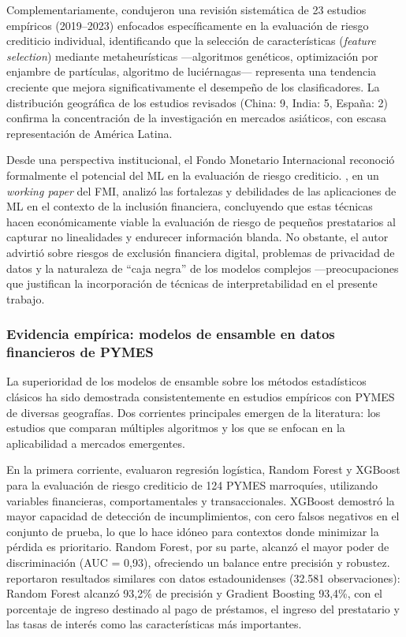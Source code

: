 \documentclass[12pt, letterpaper]{article}
\begin{document}
Complementariamente, \citet{Paz2025} condujeron una revisi\'on sistem\'atica de 23 estudios emp\'iricos (2019--2023) enfocados espec\'ificamente en la evaluaci\'on de riesgo crediticio individual, identificando que la selecci\'on de caracter\'isticas (\textit{feature selection}) mediante metaheur\'isticas ---algoritmos gen\'eticos, optimizaci\'on por enjambre de part\'iculas, algoritmo de luci\'ernagas--- representa una tendencia creciente que mejora significativamente el desempe\~no de los clasificadores. La distribuci\'on geogr\'afica de los estudios revisados (China: 9, India: 5, Espa\~na: 2) confirma la concentraci\'on de la investigaci\'on en mercados asi\'aticos, con escasa representaci\'on de Am\'erica Latina.

Desde una perspectiva institucional, el Fondo Monetario Internacional reconoci\'o formalmente el potencial del ML en la evaluaci\'on de riesgo crediticio. \citet{Bazarbash2019}, en un \textit{working paper} del FMI, analiz\'o las fortalezas y debilidades de las aplicaciones de ML en el contexto de la inclusi\'on financiera, concluyendo que estas t\'ecnicas hacen econ\'omicamente viable la evaluaci\'on de riesgo de peque\~nos prestatarios al capturar no linealidades y endurecer informaci\'on blanda. No obstante, el autor advirti\'o sobre riesgos de exclusi\'on financiera digital, problemas de privacidad de datos y la naturaleza de ``caja negra'' de los modelos complejos ---preocupaciones que justifican la incorporaci\'on de t\'ecnicas de interpretabilidad en el presente trabajo.

\subsubsection{Evidencia emp\'irica: modelos de ensamble en datos financieros de PYMES}

La superioridad de los modelos de ensamble sobre los m\'etodos estad\'isticos cl\'asicos ha sido demostrada consistentemente en estudios emp\'iricos con PYMES de diversas geograf\'ias. Dos corrientes principales emergen de la literatura: los estudios que comparan m\'ultiples algoritmos y los que se enfocan en la aplicabilidad a mercados emergentes.

En la primera corriente, \citet{Boumhidi2025} evaluaron regresi\'on log\'istica, Random Forest y XGBoost para la evaluaci\'on de riesgo crediticio de 124 PYMES marroqu\'ies, utilizando variables financieras, comportamentales y transaccionales. XGBoost demostr\'o la mayor capacidad de detecci\'on de incumplimientos, con cero falsos negativos en el conjunto de prueba, lo que lo hace id\'oneo para contextos donde minimizar la p\'erdida es prioritario. Random Forest, por su parte, alcanz\'o el mayor poder de discriminaci\'on (AUC = 0,93), ofreciendo un balance entre precisi\'on y robustez. \citet{Yufenyuy2024} reportaron resultados similares con datos estadounidenses (32.581 observaciones): Random Forest alcanz\'o 93,2\% de precisi\'on y Gradient Boosting 93,4\%, con el porcentaje de ingreso destinado al pago de pr\'estamos, el ingreso del prestatario y las tasas de inter\'es como las caracter\'isticas m\'as importantes.
\end{document}
